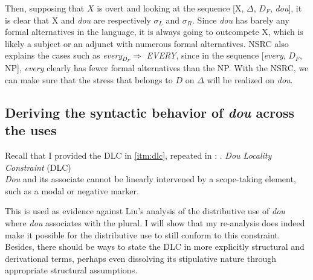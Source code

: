 \documentclass[12pt]{article}
\begin{document}
%
Then, supposing that \(X\) is overt and looking at the sequence [X, \(\Delta\), \(D_F\), \emph{dou}], it is clear that X and \emph{dou} are respectively \(\sigma_L\) and \(\sigma_R\).
Since \emph{dou} has barely any formal alternatives in the language, it is always going to outcompete X, which is likely a subject or an adjunct with numerous formal alternatives.
NSRC also explains the cases such as \emph{every}\(_{D_F} \Rightarrow\) \emph{EVERY}, since in the sequence [\emph{every}, \(D_F\), NP], \emph{every} clearly has fewer formal alternatives than the NP.
With the NSRC, we can make sure that the stress that belongs to \(D\) on \(\Delta\) will be realized on \emph{dou}.





\subsection{Deriving the syntactic behavior of \emph{dou} across the uses}
\label{sub:deriving_the_syntactic_behavior_of_dou_across_the_uses}

Recall that I provided the DLC in \cref{itm:dlc}, repeated in \Next:
\ex. \emph{\emph{Dou} Locality Constraint} (DLC)\\
\emph{Dou} and its associate cannot be linearly intervened by a scope-taking element, such as a modal or negative marker. 

This is used as evidence against Liu's analysis of the distributive use of \emph{dou} where \emph{dou} associates with the plural.
I will show that my re-analysis does indeed make it possible for the distributive use to still conform to this constraint.
Besides, there should be ways to state the DLC in more explicitly structural and derivational terms, perhaps even dissolving its stipulative nature through appropriate structural assumptions.
\end{document}
